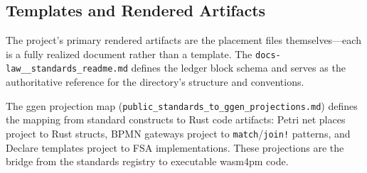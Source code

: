 \subsection{Templates and Rendered Artifacts}
\label{sec:standards-impl-templates}

The project's primary rendered artifacts are the placement files themselves---each is a
fully realized document rather than a template. The \texttt{docs-law\_\_standards\_readme.md}
defines the ledger block schema and serves as the authoritative reference for the
directory's structure and conventions.

The ggen projection map (\texttt{public\_standards\_to\_ggen\_projections.md}) defines
the mapping from standard constructs to Rust code artifacts: Petri net places project
to Rust structs, BPMN gateways project to \texttt{match}/\texttt{join!} patterns, and
Declare templates project to FSA implementations. These projections are the bridge from
the standards registry to executable wasm4pm code.
